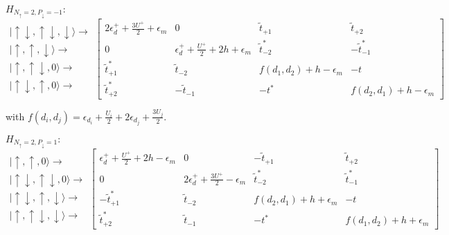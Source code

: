 $H_{N_{\uparrow}=2,P_{\downarrow}=-1}:$
\[
\begin{array}{c}
\vert\uparrow\!\downarrow,\uparrow\!\downarrow,\downarrow\rangle\rightarrow\\
\vert\uparrow,\uparrow,\downarrow\rangle\rightarrow\\
\vert\uparrow,\uparrow\!\downarrow,0\rangle\rightarrow\\
\vert\uparrow\!\downarrow,\uparrow,0\rangle\rightarrow
\end{array}\left[\begin{array}{cccc}
2\epsilon_{d}^{+}+\frac{3U^{+}}{2}+\epsilon_{m} & 0 & \tilde{t}_{+1} & \tilde{t}_{+2}\\
0 & \epsilon_{d}^{+}+\frac{U^{+}}{2}+2h+\epsilon_{m} & \tilde{t}_{-2}^{*} & -\tilde{t}_{-1}^{*}\\
\tilde{t}_{+1}^{*} & \tilde{t}_{-2} & f(d_{1},d_{2})+h-\epsilon_{m} & -t\\
\tilde{t}_{+2}^{*} & -\tilde{t}_{-1} & -t^{*} & f(d_{2},d_{1})+h-\epsilon_{m}
\end{array}\right]
\]


with $f(d_{i},d_{j})=\epsilon_{d_{i}}+\frac{U_{i}}{2}+2\epsilon_{d_{j}}+\frac{3U_{j}}{2}.$

$H_{N_{\uparrow}=2,P_{\downarrow}=1}:$
\[
\begin{array}{c}
\vert\uparrow,\uparrow,0\rangle\rightarrow\\
\vert\uparrow\!\downarrow,\uparrow\!\downarrow,0\rangle\rightarrow\\
\vert\uparrow\!\downarrow,\uparrow,\downarrow\rangle\rightarrow\\
\vert\uparrow,\uparrow\!\downarrow,\downarrow\rangle\rightarrow
\end{array}\left[\begin{array}{cccc}
\epsilon_{d}^{+}+\frac{U^{+}}{2}+2h-\epsilon_{m} & 0 & -\tilde{t}_{+1} & \tilde{t}_{+2}\\
0 & 2\epsilon_{d}^{+}+\frac{3U^{+}}{2}-\epsilon_{m} & \tilde{t}_{-2}^{*} & \tilde{t}_{-1}^{*}\\
-\tilde{t}_{+1}^{*} & \tilde{t}_{-2} & f(d_{2},d_{1})+h+\epsilon_{m} & -t\\
\tilde{t}_{+2}^{*} & \tilde{t}_{-1} & -t^{*} & f(d_{1},d_{2})+h+\epsilon_{m}
\end{array}\right]
\]

